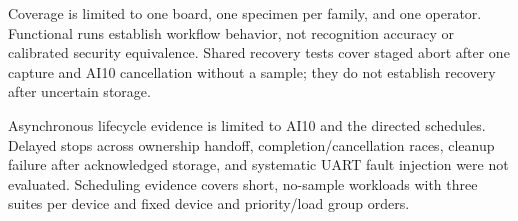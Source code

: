 Coverage is limited to one board, one specimen per family, and one operator. Functional runs establish workflow behavior, not recognition accuracy or calibrated security equivalence. Shared recovery tests cover staged abort after one capture and AI10 cancellation without a sample; they do not establish recovery after uncertain storage.

Asynchronous lifecycle evidence is limited to AI10 and the directed schedules. Delayed stops across ownership handoff, completion/cancellation races, cleanup failure after acknowledged storage, and systematic UART fault injection were not evaluated. Scheduling evidence covers short, no-sample workloads with three suites per device and fixed device and priority/load group orders.
